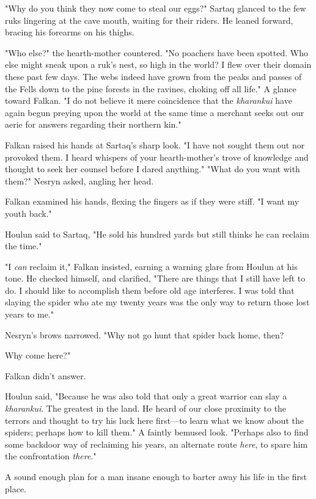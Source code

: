 "Why do you think they now come to steal our eggs?"
Sartaq glanced to the few ruks lingering at the cave mouth, waiting for their riders.
He leaned forward, bracing his forearms on his thighs.

"Who else?"
the hearth-mother countered.
"No poachers have been spotted.
Who else might sneak upon a ruk's nest, so high in the world?
I flew over their domain these past few days.
The webs indeed have grown from the peaks and passes of the Fells down to the pine forests in the ravines, choking off all life."
A glance toward Falkan.
"I do not believe it mere coincidence that the \emph{kharankui} have again begun preying upon the world at the same time a merchant seeks out our aerie for answers regarding their northern kin."

Falkan raised his hands at Sartaq's sharp look.
"I have not sought them out nor provoked them.
I heard whispers of your hearth-mother's trove of knowledge and thought to seek her counsel before I dared anything."
"What do you want with them?"
Nesryn asked, angling her head.

Falkan examined his hands, flexing the fingers as if they were stiff.
"I want my youth back."

Houlun said to Sartaq, "He sold his hundred yards but still thinks he can reclaim the time."

"I \emph{can} reclaim it," Falkan insisted, earning a warning glare from Houlun at his tone.
He checked himself, and clarified, "There are  things that I still have left to do.
I should like to accomplish them before old age interferes.
I was told that slaying the spider who ate my twenty years was the only way to return those lost years to me."

Nesryn's brows narrowed.
"Why not go hunt that spider back home, then?

Why come here?"

Falkan didn't answer.

Houlun said, "Because he was also told that only a great warrior can slay a \emph{kharankui}.
The greatest in the land.
He heard of our close proximity to the terrors and thought to try his luck here first---to learn what we know about the spiders; perhaps how to kill them."
A faintly bemused look.
"Perhaps also to find some backdoor way of reclaiming his years, an alternate route \emph{here}, to spare him the confrontation \emph{there}."

A sound enough plan for a man insane enough to barter away his life in the first place.

